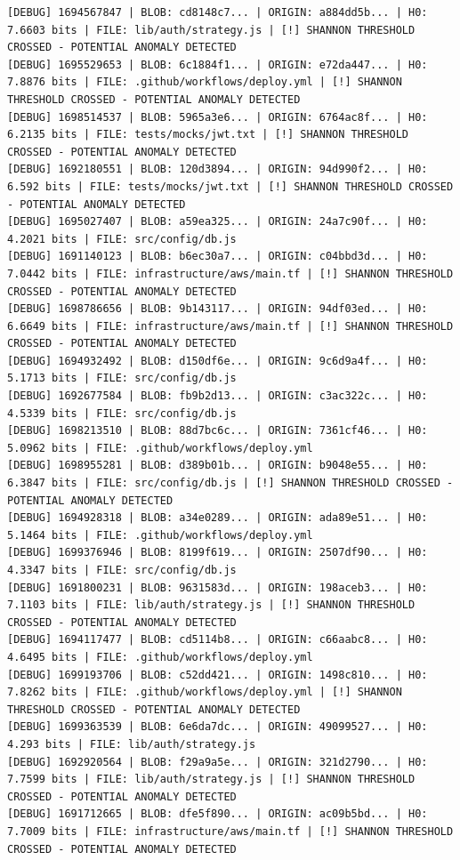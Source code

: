 \documentclass[12pt, a4paper, oneside]{report}
\begin{document}
\begin{lstlisting}[basicstyle=\tiny\ttfamily]
[DEBUG] 1694567847 | BLOB: cd8148c7... | ORIGIN: a884dd5b... | H0: 7.6603 bits | FILE: lib/auth/strategy.js | [!] SHANNON THRESHOLD CROSSED - POTENTIAL ANOMALY DETECTED
[DEBUG] 1695529653 | BLOB: 6c1884f1... | ORIGIN: e72da447... | H0: 7.8876 bits | FILE: .github/workflows/deploy.yml | [!] SHANNON THRESHOLD CROSSED - POTENTIAL ANOMALY DETECTED
[DEBUG] 1698514537 | BLOB: 5965a3e6... | ORIGIN: 6764ac8f... | H0: 6.2135 bits | FILE: tests/mocks/jwt.txt | [!] SHANNON THRESHOLD CROSSED - POTENTIAL ANOMALY DETECTED
[DEBUG] 1692180551 | BLOB: 120d3894... | ORIGIN: 94d990f2... | H0: 6.592 bits | FILE: tests/mocks/jwt.txt | [!] SHANNON THRESHOLD CROSSED - POTENTIAL ANOMALY DETECTED
[DEBUG] 1695027407 | BLOB: a59ea325... | ORIGIN: 24a7c90f... | H0: 4.2021 bits | FILE: src/config/db.js
[DEBUG] 1691140123 | BLOB: b6ec30a7... | ORIGIN: c04bbd3d... | H0: 7.0442 bits | FILE: infrastructure/aws/main.tf | [!] SHANNON THRESHOLD CROSSED - POTENTIAL ANOMALY DETECTED
[DEBUG] 1698786656 | BLOB: 9b143117... | ORIGIN: 94df03ed... | H0: 6.6649 bits | FILE: infrastructure/aws/main.tf | [!] SHANNON THRESHOLD CROSSED - POTENTIAL ANOMALY DETECTED
[DEBUG] 1694932492 | BLOB: d150df6e... | ORIGIN: 9c6d9a4f... | H0: 5.1713 bits | FILE: src/config/db.js
[DEBUG] 1692677584 | BLOB: fb9b2d13... | ORIGIN: c3ac322c... | H0: 4.5339 bits | FILE: src/config/db.js
[DEBUG] 1698213510 | BLOB: 88d7bc6c... | ORIGIN: 7361cf46... | H0: 5.0962 bits | FILE: .github/workflows/deploy.yml
[DEBUG] 1698955281 | BLOB: d389b01b... | ORIGIN: b9048e55... | H0: 6.3847 bits | FILE: src/config/db.js | [!] SHANNON THRESHOLD CROSSED - POTENTIAL ANOMALY DETECTED
[DEBUG] 1694928318 | BLOB: a34e0289... | ORIGIN: ada89e51... | H0: 5.1464 bits | FILE: .github/workflows/deploy.yml
[DEBUG] 1699376946 | BLOB: 8199f619... | ORIGIN: 2507df90... | H0: 4.3347 bits | FILE: src/config/db.js
[DEBUG] 1691800231 | BLOB: 9631583d... | ORIGIN: 198aceb3... | H0: 7.1103 bits | FILE: lib/auth/strategy.js | [!] SHANNON THRESHOLD CROSSED - POTENTIAL ANOMALY DETECTED
[DEBUG] 1694117477 | BLOB: cd5114b8... | ORIGIN: c66aabc8... | H0: 4.6495 bits | FILE: .github/workflows/deploy.yml
[DEBUG] 1699193706 | BLOB: c52dd421... | ORIGIN: 1498c810... | H0: 7.8262 bits | FILE: .github/workflows/deploy.yml | [!] SHANNON THRESHOLD CROSSED - POTENTIAL ANOMALY DETECTED
[DEBUG] 1699363539 | BLOB: 6e6da7dc... | ORIGIN: 49099527... | H0: 4.293 bits | FILE: lib/auth/strategy.js
[DEBUG] 1692920564 | BLOB: f29a9a5e... | ORIGIN: 321d2790... | H0: 7.7599 bits | FILE: lib/auth/strategy.js | [!] SHANNON THRESHOLD CROSSED - POTENTIAL ANOMALY DETECTED
[DEBUG] 1691712665 | BLOB: dfe5f890... | ORIGIN: ac09b5bd... | H0: 7.7009 bits | FILE: infrastructure/aws/main.tf | [!] SHANNON THRESHOLD CROSSED - POTENTIAL ANOMALY DETECTED

\end{lstlisting}
\end{document}
